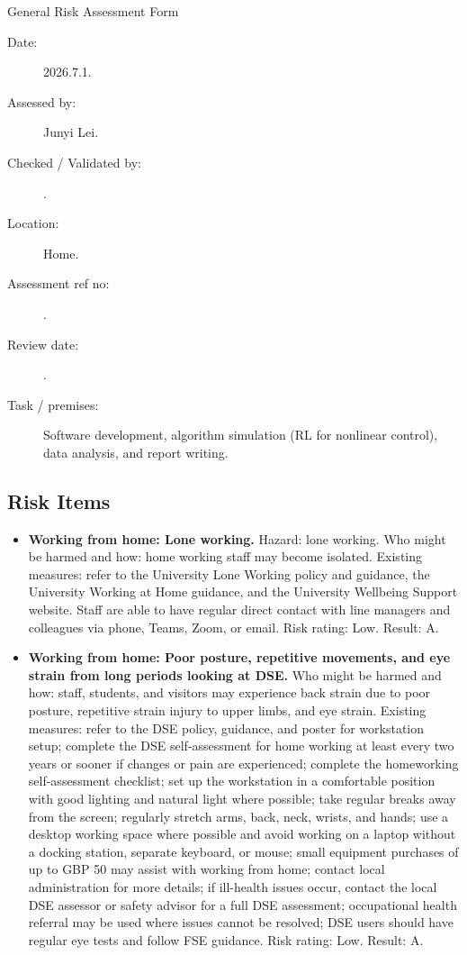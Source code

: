 \begin{uomappendix}
General Risk Assessment Form

{\small
\begin{description}
\item[Date:] 2026.7.1.
\item[Assessed by:] Junyi Lei.
\item[Checked / Validated by:] .
\item[Location:] Home.
\item[Assessment ref no:] .
\item[Review date:] .
\item[Task / premises:] Software development, algorithm simulation (RL for nonlinear control), data analysis, and report writing.
\end{description}

\subsection*{Risk Items}

\begin{itemize}[leftmargin=*]
\item \textbf{Working from home: Lone working.} Hazard: lone working. Who might be harmed and how: home working staff may become isolated. Existing measures: refer to the University Lone Working policy and guidance, the University Working at Home guidance, and the University Wellbeing Support website. Staff are able to have regular direct contact with line managers and colleagues via phone, Teams, Zoom, or email. Risk rating: Low. Result: A.

\item \textbf{Working from home: Poor posture, repetitive movements, and eye strain from long periods looking at DSE.} Who might be harmed and how: staff, students, and visitors may experience back strain due to poor posture, repetitive strain injury to upper limbs, and eye strain. Existing measures: refer to the DSE policy, guidance, and poster for workstation setup; complete the DSE self-assessment for home working at least every two years or sooner if changes or pain are experienced; complete the homeworking self-assessment checklist; set up the workstation in a comfortable position with good lighting and natural light where possible; take regular breaks away from the screen; regularly stretch arms, back, neck, wrists, and hands; use a desktop working space where possible and avoid working on a laptop without a docking station, separate keyboard, or mouse; small equipment purchases of up to GBP 50 may assist with working from home; contact local administration for more details; if ill-health issues occur, contact the local DSE assessor or safety advisor for a full DSE assessment; occupational health referral may be used where issues cannot be resolved; DSE users should have regular eye tests and follow FSE guidance. Risk rating: Low. Result: A.


\end{itemize}}
\end{uomappendix}
